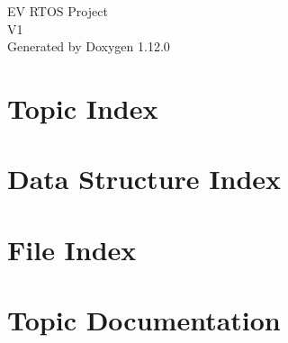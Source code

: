 \documentclass[twoside]{book}
\newcommand{\+}{\discretionary{\mbox{\scriptsize$\hookleftarrow$}}{}{}}
\newcommand{\clearemptydoublepage}{%
    \newpage{\pagestyle{empty}\cleardoublepage}%
  }
\begin{document}
  \raggedbottom
    \hypersetup{pageanchor=false,
                bookmarksnumbered=true,
                pdfencoding=unicode
               }
  \begin{titlepage}
  \vspace*{7cm}
  \begin{center}%
  {\Large EV RTOS Project}\\
  [1ex]\large V1 \\
  \vspace*{1cm}
  {\large Generated by Doxygen 1.12.0}\\
  \end{center}
  \end{titlepage}
  \clearemptydoublepage
  \tableofcontents
  \clearemptydoublepage
  \hypersetup{pageanchor=true}

\chapter{Topic Index}

\chapter{Data Structure Index}

\chapter{File Index}

\chapter{Topic Documentation}





\end{document}
